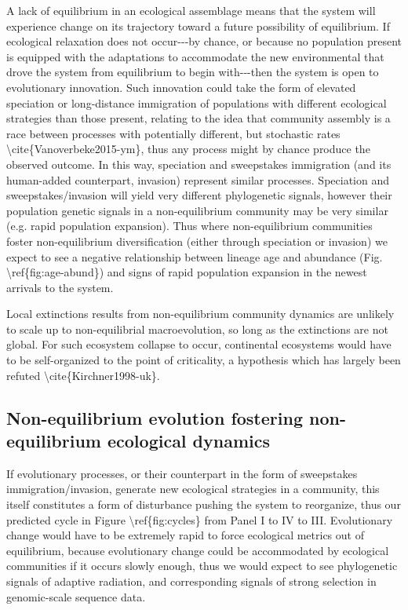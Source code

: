 \documentclass[]{article}
\begin{document}
A lack of equilibrium in an ecological assemblage means that the system
will experience change on its trajectory toward a future possibility of
equilibrium. If ecological relaxation does not occur-\/-\/-by chance, or
because no population present is equipped with the adaptations to
accommodate the new environmental that drove the system from equilibrium
to begin with-\/-\/-then the system is open to evolutionary innovation.
Such innovation could take the form of elevated speciation or
long-distance immigration of populations with different ecological
strategies than those present, relating to the idea that community
assembly is a race between processes with potentially different, but
stochastic rates \textbackslash{}cite\{Vanoverbeke2015-ym\}, thus any
process might by chance produce the observed outcome. In this way,
speciation and sweepstakes immigration (and its human-added counterpart,
invasion) represent similar processes. Speciation and
sweepstakes/invasion will yield very different phylogenetic signals,
however their population genetic signals in a non-equilibrium community
may be very similar (e.g. rapid population expansion). Thus where
non-equilibrium communities foster non-equilibrium diversification
(either through speciation or invasion) we expect to see a negative
relationship between lineage age and abundance (Fig.
\textbackslash{}ref\{fig:age-abund\}) and signs of rapid population
expansion in the newest arrivals to the system.

Local extinctions results from non-equilibrium community dynamics are
unlikely to scale up to non-equilibrial macroevolution, so long as the
extinctions are not global. For such ecosystem collapse to occur,
continental ecosystems would have to be self-organized to the point of
criticality, a hypothesis which has largely been refuted
\textbackslash{}cite\{Kirchner1998-uk\}.

\subsection{Non-equilibrium evolution fostering non-equilibrium
ecological
dynamics}\label{non-equilibrium-evolution-fostering-non-equilibrium-ecological-dynamics}

If evolutionary processes, or their counterpart in the form of
sweepstakes immigration/invasion, generate new ecological strategies in
a community, this itself constitutes a form of disturbance pushing the
system to reorganize, thus our predicted cycle in Figure
\textbackslash{}ref\{fig:cycles\} from Panel I to IV to III.
Evolutionary change would have to be extremely rapid to force ecological
metrics out of equilibrium, because evolutionary change could be
accommodated by ecological communities if it occurs slowly enough, thus
we would expect to see phylogenetic signals of adaptive radiation, and
corresponding signals of strong selection in genomic-scale sequence
data.
\end{document}
